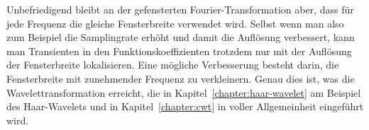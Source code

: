 Unbefriedigend bleibt an der gefensterten Fourier-Transformation aber,
dass für jede Frequenz die gleiche Fensterbreite verwendet wird.
Selbst wenn man also zum Beispiel die Samplingrate erhöht und damit
die Auflösung verbessert, kann man Transienten in den
Funktionskoeffizienten trotzdem nur mit der Auflösung der Fensterbreite
lokalisieren.
Eine mögliche Verbesserung besteht darin, die Fensterbreite mit zunehmender
Frequenz zu verkleinern.
Genau dies ist, was die Wavelettransformation erreicht, die in
Kapitel~\ref{chapter:haar-wavelet} am Beispiel des Haar-Wavelets und in
Kapitel~\ref{chapter:cwt} in voller Allgemeinheit eingeführt wird.

